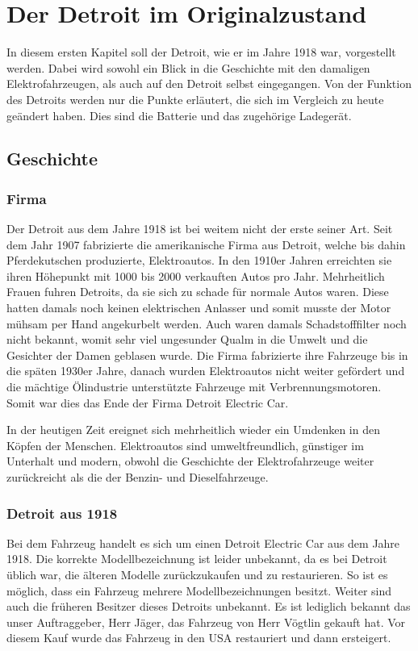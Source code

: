 \chapter{Der Detroit im Originalzustand}
In diesem ersten Kapitel soll der Detroit, wie er im Jahre 1918 war, vorgestellt werden. Dabei wird sowohl ein Blick in die Geschichte mit den damaligen Elektrofahrzeugen, als auch auf den Detroit selbst eingegangen. Von der Funktion des Detroits werden nur die Punkte erläutert, die sich im Vergleich zu heute geändert haben. Dies sind die Batterie und das zugehörige Ladegerät.

\section{Geschichte}

\subsection{Firma}

Der Detroit aus dem Jahre 1918 ist bei weitem nicht der erste seiner Art. Seit dem Jahr 1907 fabrizierte die amerikanische Firma aus Detroit, welche bis dahin Pferdekutschen produzierte, Elektroautos. In den 1910er Jahren erreichten sie ihren Höhepunkt mit 1000 bis 2000 verkauften Autos pro Jahr. Mehrheitlich Frauen fuhren Detroits, da sie sich zu schade für normale Autos waren. Diese hatten damals noch keinen elektrischen Anlasser und somit musste der Motor mühsam per Hand angekurbelt werden. Auch waren damals Schadstofffilter noch nicht bekannt, womit sehr viel ungesunder Qualm in die Umwelt und die Gesichter der Damen geblasen wurde. Die Firma fabrizierte ihre Fahrzeuge bis in die späten 1930er Jahre, danach wurden Elektroautos nicht weiter gefördert und die mächtige Ölindustrie unterstützte Fahrzeuge mit Verbrennungsmotoren. Somit war dies das Ende der Firma Detroit Electric Car.

In der heutigen Zeit ereignet sich mehrheitlich wieder ein Umdenken in den Köpfen der Menschen. Elektroautos sind umweltfreundlich, günstiger im Unterhalt und modern, obwohl die Geschichte der Elektrofahrzeuge weiter zurückreicht als die der Benzin- und Dieselfahrzeuge.

\subsection{Detroit aus 1918}

Bei dem Fahrzeug handelt es sich um einen Detroit Electric Car aus dem Jahre 1918. Die korrekte Modellbezeichnung ist leider unbekannt, da es bei Detroit üblich war, die älteren Modelle zurückzukaufen und zu restaurieren. So ist es möglich, dass ein Fahrzeug mehrere Modellbezeichnungen besitzt. Weiter sind auch die früheren Besitzer dieses Detroits unbekannt. Es ist lediglich bekannt das unser Auftraggeber, Herr Jäger, das Fahrzeug von Herr Vögtlin  gekauft hat. Vor diesem Kauf wurde das Fahrzeug in den USA restauriert und dann ersteigert.

\newpage